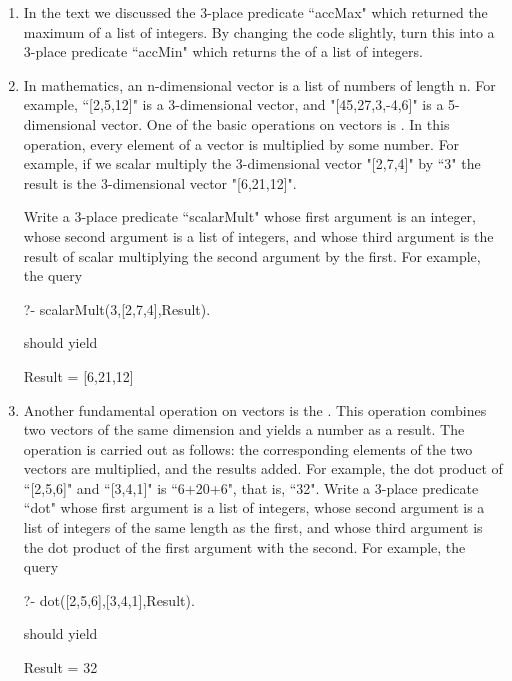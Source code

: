 \begin{enumerate}
\item{}In the text we discussed the 3-place predicate ``accMax"
which  returned the maximum of a list of integers.  By changing
the code slightly, turn this into a 3-place predicate ``accMin"
which returns the  of a list of integers.
\item{}In mathematics, an n-dimensional vector is a list of numbers of
length n. For example, ``[2,5,12]" is a 3-dimensional vector, and
"[45,27,3,-4,6]" is a 5-dimensional vector.  One of the basic
operations on vectors is . In this
operation, every element of a vector is multiplied by some number.
For example, if we scalar multiply the 3-dimensional vector
"[2,7,4]" by ``3" the result is the 3-dimensional vector
"[6,21,12]".


Write a 3-place predicate ``scalarMult" whose first
argument is an integer, whose second argument is a list of integers,
and whose third argument is the result of scalar multiplying
the second argument by the first. For example, the query
\begin{LPNcodedisplay}
?- scalarMult(3,[2,7,4],Result).
\end{LPNcodedisplay}

should yield
\begin{LPNcodedisplay}
Result = [6,21,12]
\end{LPNcodedisplay}

\item{}Another fundamental operation on vectors is the .  This operation combines two vectors of the same dimension
and yields a number as a result. The operation is carried out as
follows: the corresponding elements of the two vectors are multiplied,
and the results added. For example, the dot product of ``[2,5,6]"
and ``[3,4,1]" is ``6+20+6", that is, ``32".  Write a
3-place predicate ``dot" whose first argument is a list of
integers, whose second argument is a list of integers of the same
length as the first, and whose third argument is the dot product of
the first argument with the second.  For example, the query
\begin{LPNcodedisplay}
?- dot([2,5,6],[3,4,1],Result).
\end{LPNcodedisplay}

should yield
\begin{LPNcodedisplay}
Result = 32
\end{LPNcodedisplay}

\end{enumerate}
